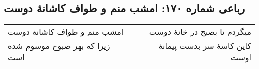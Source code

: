 \begin{center}
\section*{رباعی شماره ۱۷۰: امشب منم و طواف کاشانهٔ دوست}
\label{sec:0170}
\begin{longtable}{l p{0.5cm} r}
امشب منم و طواف کاشانهٔ دوست
&&
میگردم تا بصبح در خانهٔ دوست
\\
زیرا که بهر صبوح موسوم شده است
&&
کاین کاسهٔ سر بدست پیمانهٔ اوست
\\
\end{longtable}
\end{center}
